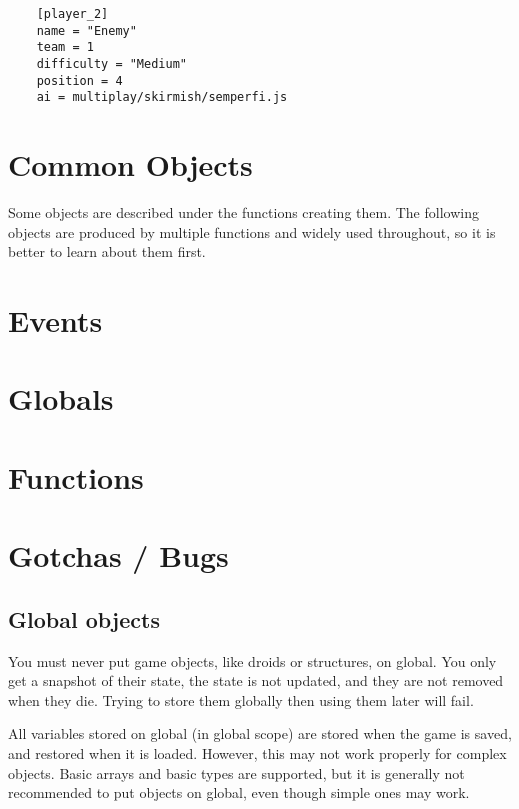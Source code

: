 \documentclass[12pt]{article}
\begin{document}
\begin{verbatim}
	[player_2]
	name = "Enemy"
	team = 1
	difficulty = "Medium"
	position = 4
	ai = multiplay/skirmish/semperfi.js
\end{verbatim}

\section{Common Objects}

Some objects are described under the functions creating them. The following objects are produced by
multiple functions and widely used throughout, so it is better to learn about them first.



\section{Events}



\section{Globals}

\begin{description}

\end{description}

\section{Functions}



\section{Gotchas / Bugs}

\subsection{Global objects}
You must never put game objects, like droids or structures, on global. You only get a snapshot of their state,
the state is not updated, and they are not removed when they die. Trying to store them globally then using them 
later will fail.

All variables stored on global (in global scope) are stored when the game is saved, and restored when it is 
loaded. However, this may not work properly for complex objects. Basic arrays and basic types are supported,
but it is generally not recommended to put objects on global, even though simple ones may work.
\end{document}
